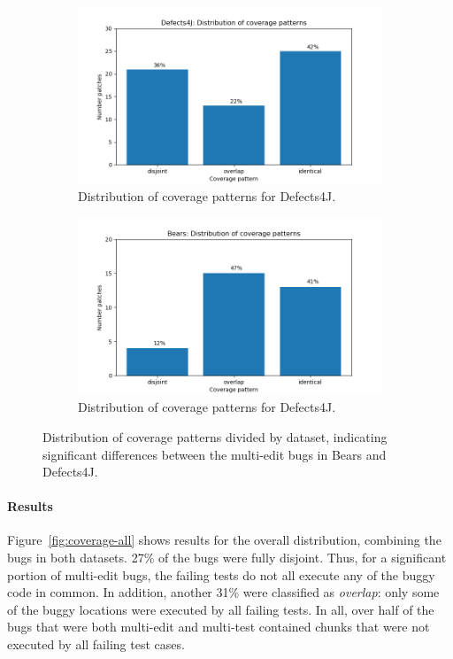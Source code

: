 \begin{figure}
	\begin{subfigure}{\linewidth}
		\includegraphics[width=\linewidth]{img/coverage-d4j.png}
		\caption{Distribution of coverage patterns for Defects4J.}
	\end{subfigure}
	\begin{subfigure}{\linewidth}
		\includegraphics[width=\linewidth]{img/coverage-bears.png}
		\caption{Distribution of coverage patterns for Defects4J.}
	\end{subfigure}
	\caption{Distribution of coverage patterns divided by dataset,
          indicating significant differences between the multi-edit bugs in
          Bears and Defects4J.}
	\label{fig:coverage-datasets}
\end{figure}

\paragraph{Results}
Figure~\ref{fig:coverage-all} shows results for the overall distribution,
combining the bugs in both datasets. 27\%
of the bugs were fully disjoint.  Thus, for a significant portion of multi-edit bugs,
the failing tests do not all execute any of the buggy code in common.  
In addition, another 31\% were classified as \emph{overlap}: only some of the
buggy locations were executed by all failing tests. In all, over half of 
the bugs that were both multi-edit and multi-test contained chunks that were 
not executed by all failing test cases.

